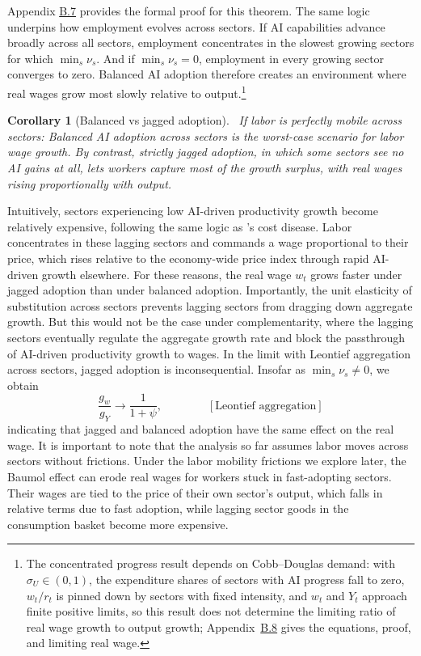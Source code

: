 \documentclass[11pt]{article}
\newtheorem{corollary}{Corollary}
\begin{document}
Appendix \href{https://ahmadlp.github.io/Lashkaripour_AI_Displacement_Online_Appendix.pdf\#page=36}{B.7} provides the formal proof for this
theorem. The same logic underpins how employment evolves across sectors.
If AI capabilities advance broadly across all sectors, employment
concentrates in the slowest growing sectors for which $\min_{s}\nu_{s}$.
And if $\min_{s}\nu_{s}=0$, employment in every growing sector converges
to zero. Balanced AI adoption therefore creates an environment where
real wages grow most slowly relative to output.\footnote{The concentrated progress result depends on Cobb--Douglas demand: with
$\sigma_{U}\in(0,1)$, the expenditure shares of sectors with AI progress
fall to zero, $w_{t}/r_{t}$ is pinned down by sectors with fixed
intensity, and $w_{t}$ and $Y_{t}$ approach finite positive limits,
so this result does not determine the limiting ratio of real wage
growth to output growth; Appendix~\href{https://ahmadlp.github.io/Lashkaripour_AI_Displacement_Online_Appendix.pdf\#page=42}{B.8} gives
the equations, proof, and limiting real wage.}

\begin{corollary}[Balanced vs jagged adoption]\label{cor:balanced-progress}
~If labor is perfectly mobile across sectors: Balanced AI adoption
across sectors is the worst-case scenario for labor wage growth. By
contrast, strictly jagged adoption, in which some sectors see no AI
gains at all, lets workers capture most of the growth surplus, with
real wages rising proportionally with output. \end{corollary}

Intuitively, sectors experiencing low AI-driven productivity growth
become relatively expensive, following the same logic as \citeauthor{baumol1967}'s
\citeyearpar{baumol1967} cost disease. Labor concentrates in these
lagging sectors and commands a wage proportional to their price, which
rises relative to the economy-wide price index through rapid AI-driven
growth elsewhere. For these reasons, the real wage $w_{t}$ grows
faster under jagged adoption than under balanced adoption. Importantly,
the unit elasticity of substitution across sectors prevents lagging
sectors from dragging down aggregate growth. But this would not be
the case under complementarity, where the lagging sectors eventually
regulate the aggregate growth rate \citep{ajj2019} and block the
passthrough of AI-driven productivity growth to wages. In the limit
with Leontief aggregation across sectors, jagged adoption is inconsequential.
Insofar as $\min_{s}\nu_{s}\neq0$, we obtain
\[
\frac{g_{w}}{g_{Y}}\longrightarrow\frac{1}{1+\psi},\qquad\qquad\left[\text{Leontief aggregation}\right]
\]
indicating that jagged and balanced adoption have the same effect
on the real wage. It is important to note that the analysis so far
assumes labor moves across sectors without frictions. Under the labor
mobility frictions we explore later, the Baumol effect can erode real
wages for workers stuck in fast-adopting sectors. Their wages are
tied to the price of their own sector's output, which falls in relative
terms due to fast adoption, while lagging sector goods in the consumption
basket become more expensive.
\end{document}
